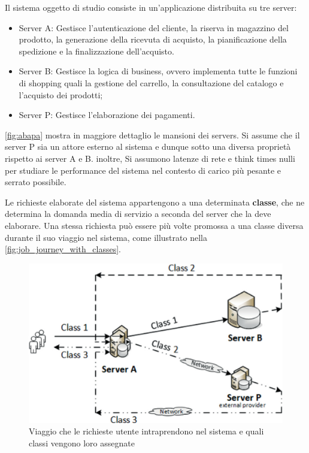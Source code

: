 Il sistema oggetto di studio consiste in un'applicazione distribuita su tre server:
\begin{itemize}
    \item Server A: Gestisce l'autenticazione del cliente, la riserva in magazzino del prodotto, la generazione della ricevuta di acquisto, la pianificazione della spedizione e la finalizzazione dell'acquisto.
    \item Server B: Gestisce la logica di business, ovvero implementa tutte le funzioni di shopping quali la gestione del carrello, la consultazione del catalogo e l'acquisto dei prodotti;
    \item Server P: Gestisce l'elaborazione dei pagamenti.
\end{itemize}

\autoref{fig:abapa} mostra in maggiore dettaglio le mansioni dei servers. Si assume che il server P sia un attore esterno al sistema e dunque sotto una diversa proprietà rispetto ai server A e B. inoltre, Si assumono latenze di rete e think times nulli per studiare le performance del sistema nel contesto di carico più pesante e serrato possibile.

Le richieste elaborate del sistema appartengono a una determinata \textbf{classe}, che ne determina la domanda media di servizio a seconda del server che la deve elaborare. Una stessa richiesta può essere più volte promossa a una classe diversa durante il suo viaggio nel sistema, come illustrato nella \autoref{fig:job_journey_with_classes}.

\begin{figure}
    \centering
    \includegraphics[width=\linewidth]{figs/job_classes.png}
    \caption{Viaggio che le richieste utente intraprendono nel sistema e quali classi vengono loro assegnate \citep{DBLP:books/sp/Serazzi24}}
    \label{fig:job_journey_with_classes}
\end{figure}

